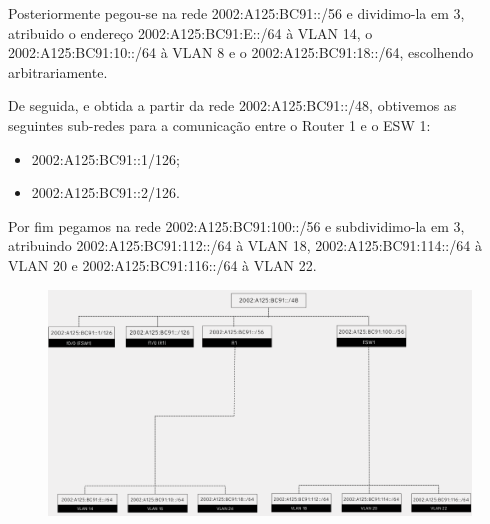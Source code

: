 \documentclass{report}
\begin{document}
Posteriormente pegou-se na rede 2002:A125:BC91::/56 e dividimo-la em 3, atribuido o endereço 2002:A125:BC91:E::/64 à VLAN 14, o 2002:A125:BC91:10::/64 à VLAN 8 e o 2002:A125:BC91:18::/64, escolhendo arbitrariamente.

De seguida, e obtida a partir da rede 2002:A125:BC91::/48, obtivemos as seguintes sub-redes para a comunicação entre o Router 1 e o ESW 1:
\begin{itemize}
    \item 2002:A125:BC91::1/126;
    \item 2002:A125:BC91::2/126.
\end{itemize}

Por fim pegamos na rede 2002:A125:BC91:100::/56 e subdividimo-la em 3, atribuindo 2002:A125:BC91:112::/64 à VLAN 18, 2002:A125:BC91:114::/64 à VLAN 20 e 2002:A125:BC91:116::/64 à VLAN 22.

\newpage
\begin{figure}[H]
    \hspace*{-4.0cm}
    \centering
    \includegraphics[width=20cm]{code/images/Horoscope Inc - IPv6.png}
\end{figure}

\newpage
\clearpage
\end{document}
